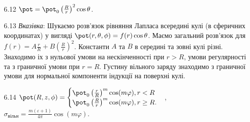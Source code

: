 \begin{Solution}{6.{12}}
	$\pot = \pot_0 \left( \frac{R}{r}\right)^2\cos\theta $.
\end{Solution}
\begin{Solution}{6.{13}}
	\emph{Вказівка}: Шукаємо розв’язок рівняння Лапласа всередині кулі (в сферичних координатах)  у вигляді $\pot(r,\theta,\phi) = f(r)\cos\theta$. Маємо загальний розв'язок для  $f(r) = A\frac{r}{R} + B\left( \frac{R}{r}\right)^2$.  Константи $A$ та $B$ в середині та зовні кулі різні. Знаходимо іх з нульової умови на нескінченності при $r>R$, умови регулярності та з граничної умови при  $r = R$. Густину вільного заряду знаходимо з граничної умови для нормальної компоненти індукції на поверхні кулі.
\end{Solution}
\begin{Solution}{6.{14}}
	\(
		\pot(R,z,\phi) =
		\begin{cases}
			\pot _0\left( \frac{r}{R} \right)^m\cos (m\varphi), r < R \\
			\pot _0\left( \frac{R}{r} \right)^m\cos (m\varphi), r \ge R.
		\end{cases}
	\),
	\(
		\sigma_\text{вільн} = \frac{m(\varepsilon  + 1)}{4\pi }\cos (m\varphi ).
	\)
\end{Solution}
